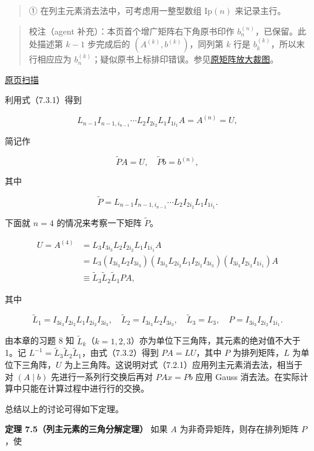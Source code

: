 \documentclass[
  10pt,
  fontset=fandol]{ctexart}
\begin{document}
\begin{quote}
① 在列主元素消去法中，可考虑用一整型数组 \(\mathrm{Ip}(n)\) 来记录主行。
\end{quote}

\begin{quote}
校注（agent 补充）：本页首个增广矩阵右下角原书印作 \(b_n^{(n)}\)，已保留。此处描述第 \(k-1\) 步完成后的 \((A^{(k)},b^{(k)})\)，同列第 \(k\) 行是 \(b_k^{(k)}\)，所以末行相应应为 \(b_n^{(k)}\)；疑似原书上标排印错误。参见\href{../assets/ch07a/pdf-187-rhs-detail.png}{原矩阵放大裁图}。
\end{quote}

\href{../../source-images/pdf-188.jpeg}{原页扫描}

利用式（7.3.1）得到

\[L_{n-1}I_{n-1,i_{n-1}}\cdots L_2I_{2i_2}L_1I_{1i_1}A=A^{(n)}=U,\]

简记作

\[\widetilde{P}A=U,\quad\widetilde{P}b=b^{(n)},\]

其中

\[\widetilde{P}=L_{n-1}I_{n-1,i_{n-1}}\cdots L_2I_{2i_2}L_1I_{1i_1}.\]

下面就 \(n=4\) 的情况来考察一下矩阵 \(\widetilde{P}\)。

\[
\begin{aligned}
U=A^{(4)}&=L_3I_{3i_3}L_2I_{2i_2}L_1I_{1i_1}A\\
&=L_3(I_{3i_3}L_2I_{3i_3})(I_{3i_3}L_{2i_2}L_1I_{2i_2}I_{3i_3})(I_{3i_3}I_{2i_2}I_{1i_1})A\\
&\equiv\widetilde{L}_3\widetilde{L}_2\widetilde{L}_1PA,
\end{aligned}
\tag{7.3.2}
\]

其中

\[\widetilde{L}_1=I_{3i_3}I_{2i_2}L_1I_{2i_2}I_{3i_3},\quad
\widetilde{L}_2=I_{3i_3}L_2I_{3i_3},\quad
\widetilde{L}_3=L_3,\quad P=I_{3i_3}I_{2i_2}I_{1i_1}.\]

由本章的习题 8 知 \(\widetilde{L}_k\)（\(k=1,2,3\)）亦为单位下三角阵，其元素的绝对值不大于 1。记 \(L^{-1}=\widetilde{L}_3\widetilde{L}_2\widetilde{L}_1\)，由式（7.3.2）得到 \(PA=LU\)，其中 \(P\) 为排列矩阵，\(L\) 为单位下三角阵，\(U\) 为上三角阵。这说明对式（7.2.1）应用列主元素消去法，相当于对 \((A\mid b)\) 先进行一系列行交换后再对 \(PAx=Pb\) 应用 Gauss 消去法。在实际计算中只能在计算过程中进行行的交换。

总结以上的讨论可得如下定理。

\textbf{定理 7.5（列主元素的三角分解定理）} 如果 \(A\) 为非奇异矩阵，则存在排列矩阵 \(P\)，使
\end{document}
